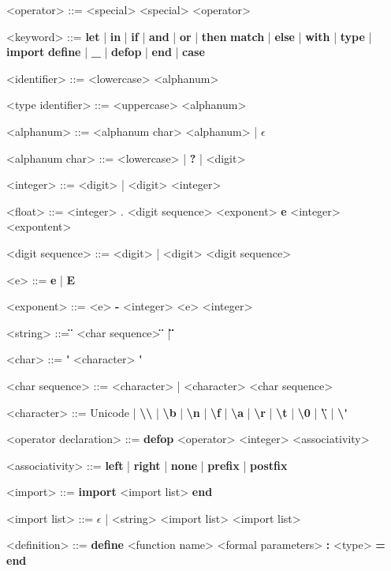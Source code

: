 \documentclass[12pt]{article}
\begin{document}
\begin{grammar}

<operator> ::= <special>
    \alt <special> <operator>

<keyword> ::= \textbf{let} | \textbf{in} | \textbf{if} | \textbf{and} 
    | \textbf{or} | \textbf{then}
    \alt \textbf{match} | \textbf{else} | \textbf{with} | \textbf{type} 
    | \textbf{import} \alt \textbf{define} | \textbf{_} | \textbf{defop} 
    | \textbf{end} | \textbf{case}

<identifier> ::= <lowercase> <alphanum>

<type identifier> ::= <uppercase> <alphanum>

<alphanum> ::= <alphanum char> <alphanum> | $\epsilon$

<alphanum char> ::= <lowercase> | \textbf{?} | <digit>

<integer> ::= <digit> | <digit> <integer>

<float> ::= <integer> . <digit sequence> <exponent> \textbf{e}
    \alt <integer> <expontent>

<digit sequence> ::= <digit> | <digit> <digit sequence>

<e> ::= \textbf{e} | \textbf{E}

<exponent> ::= <e> \textbf{-} <integer>
    \alt <e> <integer>

<string> ::= \textbf{\"} <char sequence> \textbf{\"} | \textbf{\"}\textbf{\"}

<char> ::= \textbf{\'} <character> \textbf{\'}

<char sequence> ::= <character> | <character> <char sequence>

<character> ::= Unicode
    | \textbf{\textbackslash\textbackslash}
    | \textbf{\textbackslash b}
    | \textbf{\textbackslash n}
    | \textbf{\textbackslash f}
    | \textbf{\textbackslash a}
    | \textbf{\textbackslash r}
    | \textbf{\textbackslash t}
    | \textbf{\textbackslash 0}
    | \textbf{\textbackslash \"}
    | \textbf{\textbackslash \'}

<operator declaration> ::= \textbf{defop} <operator> <integer> <associativity>

<associativity> ::= \textbf{left} | \textbf{right} 
    | \textbf{none} | \textbf{prefix} | \textbf{postfix}

<import> ::= \textbf{import} <import list> \textbf{end}

<import list> ::= $\epsilon$ | <string> <import list>
     <import list>

<definition> ::= \textbf{define} <function name> <formal parameters> 
    \textbf{:} <type> \textbf{=} \textbf{end}


\end{grammar}
\end{document}
